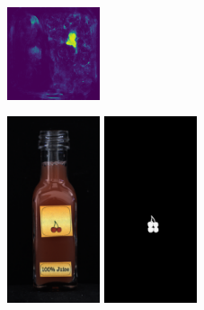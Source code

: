 \begin{figure}[H]
\begin{subfigure}[b]{\textwidth}
\begin{minipage}{0.45\textwidth}
            \includegraphics[width=0.3\textwidth]{figures/appendix/appendix_DRAEM/BB/226_mask.png}
        \end{minipage}
    \end{subfigure}
    
    \begin{subfigure}[b]{\textwidth}
        \centering
        \begin{minipage}{0.45\textwidth}
            \centering
            \includegraphics[width=0.3\textwidth]{figures/appendix/appendix_DRAEM/JB/139.png}
            \includegraphics[width=0.3\textwidth]{figures/appendix/appendix_DRAEM/JB/139_m.png}

\end{minipage}
\end{subfigure}
\end{figure}
